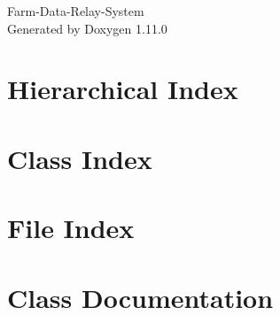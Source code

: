 \documentclass[twoside]{book}
\newcommand{\+}{\discretionary{\mbox{\scriptsize$\hookleftarrow$}}{}{}}
\newcommand{\clearemptydoublepage}{%
    \newpage{\pagestyle{empty}\cleardoublepage}%
  }
\begin{document}
  \raggedbottom
    \hypersetup{pageanchor=false,
                bookmarksnumbered=true,
                pdfencoding=unicode
               }
  \begin{titlepage}
  \vspace*{7cm}
  \begin{center}%
  {\Large Farm-\/\+Data-\/\+Relay-\/\+System}\\
  \vspace*{1cm}
  {\large Generated by Doxygen 1.11.0}\\
  \end{center}
  \end{titlepage}
  \clearemptydoublepage
  \tableofcontents
  \clearemptydoublepage
  \hypersetup{pageanchor=true}





\chapter{Hierarchical Index}

\chapter{Class Index}

\chapter{File Index}

\chapter{Class Documentation}















\end{document}
